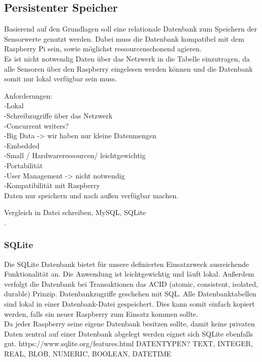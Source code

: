 \subsection{Persistenter Speicher}
Basierend auf den Grundlagen soll eine relationale Datenbank zum Speichern der Sensorwerte genutzt werden. Dabei muss die Datenbank kompatibel mit dem Raspberry Pi sein, sowie möglichst ressourcenschonend agieren. \\Es ist nicht notwendig Daten über das Netzwerk in die Tabelle einzutragen, da alle Sensoren über den Raspberry eingelesen werden können und die Datenbank somit nur lokal verfügbar sein muss.  

Anforderungen:\\
-Lokal \\
-Schreibzugriffe über das Netzwerk\\
-Concurrent writers?\\
-Big Data -> wir haben nur kleine Datenmengen\\
-Embedded\\
-Small / Hardwareressourcen/ leichtgewichtig\\
-Portabilität\\
-User Management -> nicht notwendig\\
-Kompatibilität mit Raspberry\\

Daten nur speichern und nach außen verfügbar machen.

Vergleich in Datei schreiben, MySQL, SQLite\\
.
\subsubsection{SQLite}
Die SQLite Datenbank bietet für unsere definierten Einsatzzweck ausreichende Funktionalität an. Die Anwendung ist leichtgewichtig und läuft lokal. Außerdem verfolgt die Datenbank bei Transaktionen das ACID (atomic, consistent, isolated, durable) Prinzip. Datenbankzugriffe geschehen mit SQL. Alle Datenbanktabellen sind lokal in einer Datenbank-Datei gespeichert. Dies kann somit einfach kopiert werden, falls ein neuer Raspberry zum Einsatz kommen sollte.\\
Da jeder Raspberry seine eigene Datenbank besitzen sollte, damit keine privaten Daten zentral auf einer Datenbank abgelegt werden eignet sich SQLite ebenfalls gut.   https://www.sqlite.org/features.html
DATENTYPEN? TEXT, INTEGER, REAL, BLOB, NUMERIC, BOOLEAN, DATETIME


